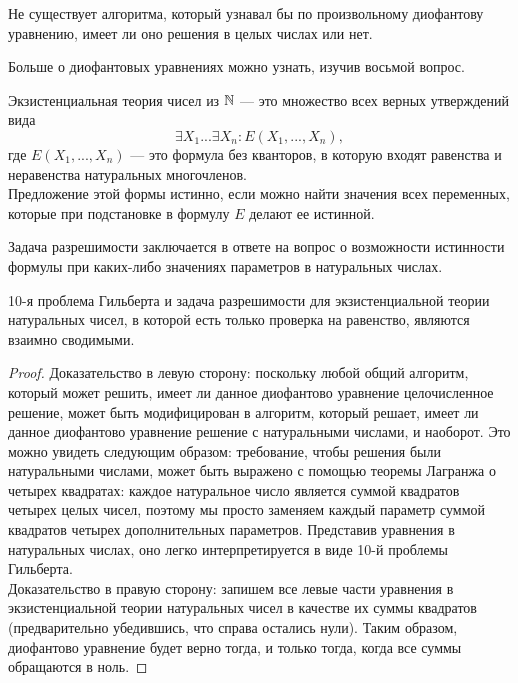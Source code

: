     
    \begin{Thm}
        Не существует алгоритма, который узнавал бы по произвольному диофантову уравнению, имеет ли оно решения в целых числах или нет.
    \end{Thm}
    \begin{Rem}
        Больше о диофантовых уравнениях можно узнать, изучив восьмой вопрос.
    \end{Rem}

    
    \begin{Def}
        Экзистенциальная теория чисел из $\mathbb{N}$ --- это множество всех верных утверждений вида 
        $$\exists X_{1} ... \exists X_{n} : E(X_{1}, ..., X_{n}),$$ где $E(X_{1}, ..., X_{n})$ --- это формула без кванторов, в которую входят равенства и неравенства натуральных многочленов.\\
        Предложение этой формы истинно, если можно найти значения всех переменных, которые при подстановке в формулу $E$ делают ее истинной.
    \end{Def}
    \begin{Def}
        Задача разрешимости заключается в ответе на вопрос о возможности истинности формулы при каких-либо значениях параметров в натуральных числах.
    \end{Def}
    \begin{Thm}
        10-я проблема Гильберта и задача разрешимости для экзистенциальной теории натуральных чисел, в которой есть только проверка на равенство, являются взаимно сводимыми.
    \end{Thm}
    \begin{proof}
        Доказательство в левую сторону: поскольку любой общий алгоритм, который может решить, имеет ли данное диофантово уравнение целочисленное решение, может быть модифицирован в алгоритм, который решает, имеет ли данное диофантово уравнение решение с натуральными числами, и наоборот.  Это можно увидеть следующим образом: требование, чтобы решения были натуральными числами, может быть выражено с помощью теоремы Лагранжа о четырех квадратах: каждое натуральное число является суммой квадратов четырех целых чисел, поэтому мы просто заменяем каждый параметр суммой квадратов четырех дополнительных параметров. Представив уравнения в натуральных числах, оно легко интерпретируется в виде 10-й проблемы Гильберта.\\
        Доказательство в правую сторону: запишем все левые части уравнения в экзистенциальной теории натуральных чисел в качестве их суммы квадратов (предварительно убедившись, что справа остались нули). Таким образом, диофантово уравнение будет верно тогда, и только тогда, когда все суммы обращаются в ноль.
    \end{proof}
    
